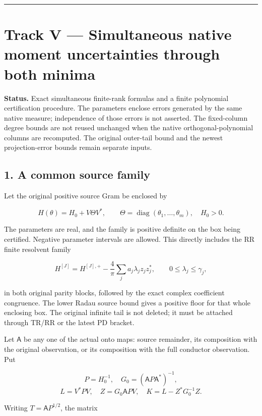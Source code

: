 \begin{center}\rule{0.5\linewidth}{0.5pt}\end{center}

\section{Track V --- Simultaneous native moment uncertainties through
both
minima}\label{track-v-simultaneous-native-moment-uncertainties-through-both-minima}

\textbf{Status.} Exact simultaneous finite-rank formulas and a finite
polynomial certification procedure. The parameters enclose errors
generated by the same native measure; independence of those errors is
not asserted. The fixed-column degree bounds are not reused unchanged
when the native orthogonal-polynomial columns are recomputed. The
original outer-tail bound and the newest projection-error bounds remain
separate inputs.

\subsection{1. A common source family}\label{a-common-source-family}

Let the original positive source Gram be enclosed by

\[
 H(\theta)=H_0+V\Theta V^*,\qquad
 \Theta=\operatorname{diag}(\theta_1,\ldots,\theta_m),
 \quad H_0>0.
\]

The parameters are real, and the family is positive definite on the box
being certified. Negative parameter intervals are allowed. This directly
includes the RR finite resolvent family

\[
 H^{[J]}=H^{[J],+}
 -\frac4\pi\sum_j a_j\lambda_j z_jz_j^*,
 \qquad0\le\lambda_j\le\gamma_j,
\]

in both original parity blocks, followed by the exact complex
coefficient congruence. The lower Radau source bound gives a positive
floor for that whole enclosing box. The original infinite tail is not
deleted; it must be attached through TR/RR or the latest PD bracket.

Let \(\mathsf A\) be any one of the actual onto maps: source remainder,
its composition with the original observation, or its composition with
the full conductor observation. Put

\[
 P=H_0^{-1},\quad G_0=(\mathsf A P\mathsf A^*)^{-1},
\] \[
 L=V^*PV,\quad Z=G_0\mathsf A PV,
 \quad K=L-Z^*G_0^{-1}Z.
\]

Writing \(T=\mathsf A P^{1/2}\), the matrix

